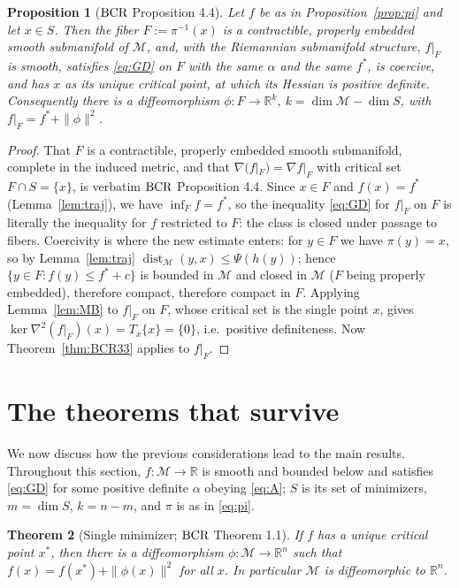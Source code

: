 \documentclass[11pt]{article}
\theoremstyle{plain}
\newtheorem{thm}{Theorem}[section]
\newtheorem{prop}[thm]{Proposition}
\theoremstyle{definition}
\theoremstyle{remark}
\newcommand{\M}{\mathcal{M}}
\newcommand{\R}{\mathbb{R}}
\DeclareMathOperator{\dist}{dist}
\newcommand{\bcr}{\textup{BCR}}
\begin{document}
\begin{prop}[$\bcr$ Proposition 4.4]\label{prop:fiber}
Let $f$ be as in Proposition~\ref{prop:pi} and let $x\in S$. Then the fiber
$F := \pi^{-1}(x)$ is a contractible, properly embedded smooth submanifold of
$\M$, and, with the Riemannian submanifold structure, $f|_F$ is smooth, satisfies
\eqref{eq:GD} on $F$ with the same $\alpha$ and the same $f^*$, is coercive, and
has $x$ as its unique critical point, at which its Hessian is positive definite.
Consequently there is a diffeomorphism $\phi\colon F\to\R^k$,
$k = \dim\M - \dim S$, with $f|_F = f^* + \|\phi\|^2$.
\end{prop}

\begin{proof}
That $F$ is a contractible, properly embedded smooth submanifold, complete in the
induced metric, and that $\nabla(f|_F) = \nabla f|_F$ with critical set
$F\cap S = \{x\}$, is verbatim $\bcr$ Proposition 4.4. Since $x\in F$ and
$f(x)=f^*$ (Lemma~\ref{lem:traj}), we have $\inf_F f = f^*$, so the inequality
\eqref{eq:GD} for $f|_F$ on $F$ is literally the inequality for $f$ restricted
to $F$: the class is closed under passage to fibers. Coercivity is where the new
estimate enters: for $y\in F$ we have $\pi(y)=x$, so by Lemma~\ref{lem:traj}
$\dist_\M(y,x) \le \Psi(h(y))$; hence
$\{y\in F : f(y)\le f^*+c\}$ is bounded in $\M$ and closed in $\M$ ($F$ being
properly embedded), therefore compact, therefore compact in $F$. Applying
Lemma~\ref{lem:MB} to $f|_F$ on $F$, whose critical set is the single point $x$,
gives $\ker\nabla^2(f|_F)(x) = T_x\{x\} = \{0\}$, i.e.\ positive definiteness.
Now Theorem~\ref{thm:BCR33} applies to $f|_F$.
\end{proof}

\section{The theorems that survive}
\label{sec:survive}

We now discuss how the previous considerations lead to the main results.
Throughout this section, $f\colon\M\to\R$ is smooth
and bounded below and satisfies \eqref{eq:GD} for some positive definite
$\alpha$ obeying \eqref{eq:A}; $S$ is its set of minimizers, $m = \dim S$,
$k = n-m$, and $\pi$ is as in \eqref{eq:pi}.

\begin{thm}[Single minimizer; $\bcr$ Theorem 1.1]\label{thm:one}
If $f$ has a unique critical point $x^*$, then there is a diffeomorphism
$\phi\colon\M\to\R^n$ such that $f(x) = f(x^*) + \|\phi(x)\|^2$ for all $x$. In
particular $\M$ is diffeomorphic to $\R^n$.
\end{thm}
\end{document}
